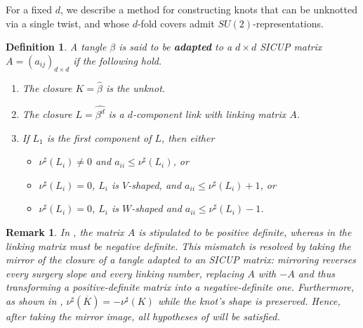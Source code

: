 \documentclass[11pt]{amsart}
\newtheorem{remark}[theorem]{Remark}
\newtheorem{definition}[theorem]{Definition}
\begin{document}
For a fixed $d$, we describe a method for constructing knots that can be unknotted via a single twist, and whose $d$-fold covers admit $SU(2)$-representations.

\begin{definition}\label{defn: braid adapted to a SICUP matrix}
 A tangle $\beta$ is said to be {\bf adapted} to a $d\times d$ SICUP matrix $A=(a_{ij})_{d\times d}$ if the following hold.
\begin{enumerate}
	\item The closure $K = \widehat{\beta}$ is the unknot.
	\item The closure $L = \widehat{\beta^d}$ is a $d$-component link with linking matrix $A$.
	\item If $L_1$ is the first component of $L$, then either
            \begin{itemize}
            \item $\nu^\sharp(L_i)\neq 0$ and $a_{ii}\leq \nu^\sharp(L_i)$, or
            \item $\nu^\sharp(L_i)=0$, $L_i$ is $V$-shaped, and $a_{ii}\leq \nu^\sharp(L_i)+1$, or
            \item $\nu^\sharp(L_i)=0$, $L_i$ is $W$-shaped and $a_{ii}\leq \nu^\sharp(L_i)-1$.
            \end{itemize}
\end{enumerate}
\end{definition}

%		
%		

\begin{remark}\label{neg-to-pos} In , the matrix $A$ is stipulated to be positive definite, whereas in  the linking matrix must be negative definite. This mismatch is resolved by taking the mirror of the closure of a tangle adapted to an SICUP matrix: mirroring reverses every surgery slope and every linking number, replacing $A$ with $-A$ and thus transforming a positive-definite matrix into a negative-definite one. Furthermore, as shown in \cite{baldwin2020concordance}, $\nu^{\sharp}(\overline{K}) = -\nu^{\sharp}(K)$ while the knot’s shape is preserved. Hence, after taking the mirror image, all hypotheses of  will be satisfied.
\end{remark}
\end{document}

